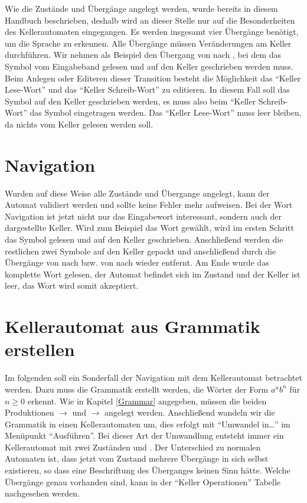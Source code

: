 Wie die Zustände und Übergänge angelegt werden, wurde bereits in diesem Handbuch
beschrieben, deshalb wird an dieser Stelle nur auf die Besonderheiten des
Kellerautomaten eingegangen. Es werden insgesamt vier Übergänge benötigt, um die
Sprache zu erkennen. Alle Übergänge müssen Veränderungen am Keller durchführen.
Wir nehmen als Beispiel den Übergang von  nach , bei dem das
Symbol  vom Eingabeband gelesen und auf den Keller geschrieben werden
muss. Beim Anlegen oder Editeren dieser Transition besteht die Möglichkeit das
"`Keller Lese-Wort"' und das "`Keller Schreib-Wort"' zu editieren. In diesem Fall
soll das Symbol  auf den Keller geschrieben werden, es muss also beim
"`Keller Schreib-Wort"' das Symbol  eingetragen werden. Das "`Keller
Lese-Wort"' muss leer bleiben, da nichts vom Keller gelesen werden
soll.\vspace{10pt}


\section{Navigation}

Wurden auf diese Weise alle Zustände und Übergange angelegt, kann der Automat
validiert werden und sollte keine Fehler mehr aufweisen. Bei der Wort
Navigation ist jetzt nicht nur das Eingabewort interessant, sondern auch der
dargestellte Keller. Wird zum Beispiel das Wort  gewählt, wird im
ersten Schritt das Symbol  gelesen und auf den Keller geschrieben.
Anschließend werden die restlichen zwei Symbole  auf den Keller
gepackt und anschließend durch die Übergänge von  nach 
bzw. von  nach  wieder entfernt. Am Ende wurde das
komplette Wort  gelesen, der Automat befindet sich im Zustand
 und der Keller ist leer, das Wort wird somit akzeptiert.


\section{Kellerautomat aus Grammatik erstellen}

Im folgenden soll ein Sonderfall der Navigation mit dem Kellerautomat betrachtet
werden. Dazu muss die Grammatik erstellt werden, die Wörter der Form $a^n b^n$
für $n \geq 0$ erkennt. Wie in Kapitel \ref{Grammar} angegeben, müssen die beiden
Produktionen  $\to$ \TerminalSymbol{$\epsilon$} und
 $\to$ 
angelegt werden. Anschließend wandeln wir die Grammatik in einen
Kellerautomaten um, dies erfolgt mit "`Umwandel in\ldots"' im Menüpunkt
"`Ausführen"'. Bei dieser Art der Umwandlung entsteht immer ein Kellerautomat
mit zwei Zuständen  und . Der Unterschied zu normalen
Automaten ist, dass jetzt vom Zustand  mehrere Übergänge in sich
selbst existieren, so dass eine Beschriftung des Überganges keinen Sinn hätte.
Welche Übergänge genau vorhanden sind, kann in der "`Keller Operationen"'
Tabelle nachgesehen werden.\vspace{10pt}

